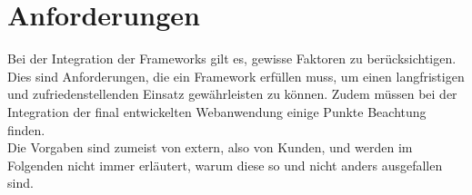 \section{Anforderungen}
\label{sec:anforderungen_webframeworks}

Bei der Integration der Frameworks gilt es, gewisse Faktoren zu berücksichtigen. Dies sind Anforderungen, die ein Framework erfüllen muss, um einen langfristigen und zufriedenstellenden Einsatz gewährleisten zu können. Zudem müssen bei der Integration der final entwickelten Webanwendung einige Punkte Beachtung finden. \\
Die Vorgaben sind zumeist von extern, also von Kunden, und werden im Folgenden nicht immer erläutert, warum diese so und nicht anders ausgefallen sind. 







